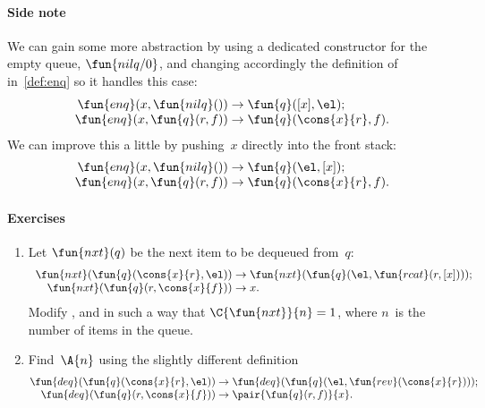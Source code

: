 \paragraph{Side note}

We can gain some more abstraction by using a dedicated constructor for
the empty queue, \(\fun{nilq/0}\), and changing accordingly the
definition of  in~\eqref{def:enq}  so it
handles this case:
\begin{equation*}
\begin{array}{r@{\;}l@{\;}l}
\fun{enq}(x,\fun{nilq}()) & \rightarrow & \fun{q}([x],\el);\\
\fun{enq}(x,\fun{q}(r,f)) & \rightarrow & \fun{q}(\cons{x}{r},f).
\end{array}
\end{equation*}
We can improve this a little by pushing~\(x\) directly into the front
stack:
\begin{equation*}
\begin{array}{r@{\;}l@{\;}l}
\fun{enq}(x,\fun{nilq}()) & \rightarrow & \fun{q}(\el,[x]);\\
\fun{enq}(x,\fun{q}(r,f)) & \rightarrow & \fun{q}(\cons{x}{r},f).
\end{array}
\end{equation*}

\paragraph{Exercises}
\begin{enumerate}

  \item Let \(\fun{nxt}(q)\) be the next item
    to be dequeued from~\(q\):
    \begin{equation*}
      \begin{array}{r@{\;}l@{\;}l}
        \fun{nxt}(\fun{q}(\cons{x}{r},\el)) & \rightarrow
        & \fun{nxt}(\fun{q}(\el,\fun{rcat}(r,[x])));\\
        \fun{nxt}(\fun{q}(r,\cons{x}{f})) & \rightarrow & x.
        \index{q@\fun{q/2}}
      \end{array}
    \end{equation*}
    Modify ,
     and
     in such a way that
    \(\C{\fun{nxt}}{n} = 1\), where
    \(n\)~is the number of items in the queue.

    \item Find~\(\A{n}\) using the slightly different definition
      \begin{equation*}
        \begin{array}{@{}r@{\;}l@{\;}l@{}}
          \fun{deq}(\fun{q}(\cons{x}{r},\el))
          & \rightarrow
          & \fun{deq}(\fun{q}(\el,\fun{rev}(\cons{x}{r})));\\
          \fun{deq}(\fun{q}(r,\cons{x}{f}))
          & \rightarrow
          & \pair{\fun{q}(r,f)}{x}.
        \end{array}
      \end{equation*}

\end{enumerate}

